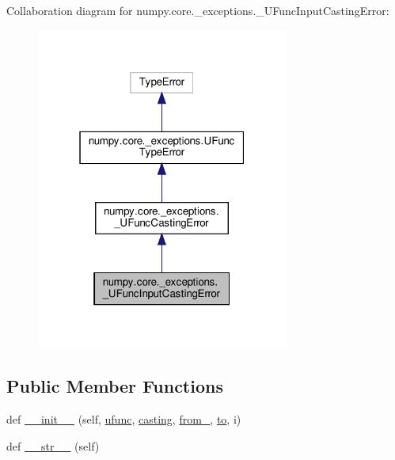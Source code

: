 Collaboration diagram for numpy.\+core.\+\_\+exceptions.\+\_\+\+U\+Func\+Input\+Casting\+Error\+:
\nopagebreak
\begin{figure}[H]
\begin{center}
\leavevmode
\includegraphics[width=235pt]{classnumpy_1_1core_1_1__exceptions_1_1__UFuncInputCastingError__coll__graph}
\end{center}
\end{figure}
\subsection*{Public Member Functions}
\begin{DoxyCompactItemize}
\item 
def \hyperlink{classnumpy_1_1core_1_1__exceptions_1_1__UFuncInputCastingError_ab07526751bd2c3122879a2e4680df00b}{\+\_\+\+\_\+init\+\_\+\+\_\+} (self, \hyperlink{classnumpy_1_1core_1_1__exceptions_1_1UFuncTypeError_a10866e4bfc9971e5aa77e8cd1c9e04f4}{ufunc}, \hyperlink{classnumpy_1_1core_1_1__exceptions_1_1__UFuncCastingError_aa7f02b5f0d75e682745e4209562dd04b}{casting}, \hyperlink{classnumpy_1_1core_1_1__exceptions_1_1__UFuncCastingError_a22df479bb7b9fed1dbd3d8701220edae}{from\+\_\+}, \hyperlink{classnumpy_1_1core_1_1__exceptions_1_1__UFuncCastingError_ab32680c508e0a39838f7996773627e68}{to}, i)
\item 
def \hyperlink{classnumpy_1_1core_1_1__exceptions_1_1__UFuncInputCastingError_a3daef3c1995a63a98fabf25aaa706194}{\+\_\+\+\_\+str\+\_\+\+\_\+} (self)
\end{DoxyCompactItemize}
